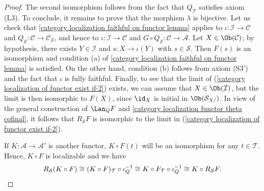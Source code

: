 \begin{proof}
The second isomorphism follows from the fact that $Q_\mathcal{T}$ satisfies axiom (L3). To conclude, it remains to prove that the morphism $\lambda$ is bijective. Let us check that \cref{category localization faithful on functor lemma} applies to $\iota:\mathcal{I}\to\mathcal{C}$ and $Q_\mathcal{S}:\mathcal{C}\to\mathcal{C}_\mathcal{S}$, and hence to $\iota:\mathcal{I}\to\mathcal{C}$ and $G\circ Q_\mathcal{S}:\mathcal{C}\to\mathcal{A}$. Let $X\in\Ob(\mathcal{C})$; by hypothesis, there exists $Y\in\mathcal{I}$ and $s:X\to\iota(Y)$ with $s\in\mathcal{S}$. Then $F(s)$ is an isomorphism and condition (a) of \cref{category localization faithful on functor lemma} is satisfied. On the other hand, condition (b) follows from axiom (S3') and the fact that $\iota$ is fully faithful. Finally, to see that the limit of (\ref{category localization of functor exist if-2}) exists, we can assume that $X\in\Ob(\mathcal{I})$, but the limit is then isomorphic to $F(X)$, since $\id_X$ is initial in $\Ob(\mathcal{S}_{X/})$. In view of the general construction of $\Lan_QF$ and \cref{category localization functor theta cofinal}, it follows that $R_\mathcal{S}F$ is isomorphic to the limit in (\ref{category localization of functor exist if-2}).\par
If $K:\mathcal{A}\to\mathcal{A}'$ is another functor, $K\circ F(t)$ will be an isomorphism for any $t\in\mathcal{T}$. Hence, $K\circ F$ is localizable and we have
\begin{equation*}
R_\mathcal{S}(K\circ F)\cong (K\circ F)_\mathcal{T}\circ\iota_Q^{-1}\cong K\circ F_\mathcal{T}\circ\iota_Q^{-1}\cong K\circ R_\mathcal{S}F.\qedhere
\end{equation*}
\end{proof}

